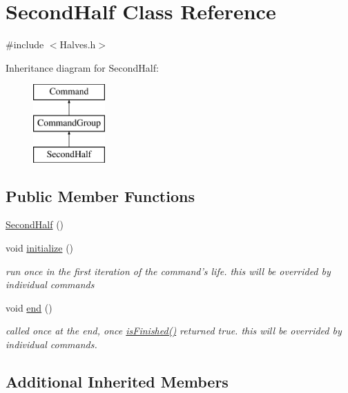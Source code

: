 \hypertarget{classSecondHalf}{\section{Second\-Half Class Reference}
\label{classSecondHalf}
}


{\ttfamily \#include $<$Halves.\-h$>$}

Inheritance diagram for Second\-Half\-:\begin{figure}[H]
\begin{center}
\leavevmode
\includegraphics[height=3.000000cm]{classSecondHalf}
\end{center}
\end{figure}
\subsection*{Public Member Functions}
\begin{DoxyCompactItemize}
\item 
\hyperlink{classSecondHalf_a5e09fa157f0527e3d1235440e7cbb38e}{Second\-Half} ()
\item 
void \hyperlink{classSecondHalf_ac10f048815ccf919db94e8989296c476}{initialize} ()
\begin{DoxyCompactList}\small\item\em run once in the first iteration of the command's life. this will be overrided by individual commands \end{DoxyCompactList}\item 
void \hyperlink{classSecondHalf_af5109aeb943c0ec9384f065bc862a43c}{end} ()
\begin{DoxyCompactList}\small\item\em called once at the end, once \hyperlink{classCommandGroup_a96807a2763adf9e21ebf2cb9e3574e3c}{is\-Finished()} returned true. this will be overrided by individual commands. \end{DoxyCompactList}\end{DoxyCompactItemize}
\subsection*{Additional Inherited Members}


